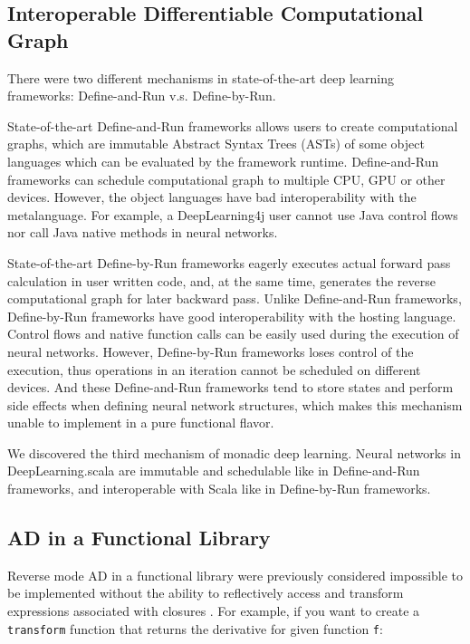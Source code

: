 \subsection{Interoperable Differentiable Computational Graph}

There were two different mechanisms in state-of-the-art deep learning frameworks:
Define-and-Run v.s. Define-by-Run.

State-of-the-art Define-and-Run frameworks \cite{collobert2008torch,bergstra2010theano,jia2014caffe,chen2015mxnet,abadi2016tensorflow,intel2016bigdl,skymind2017deeplearning4j} allows users to create computational graphs, which are immutable Abstract Syntax Trees (ASTs) of some object languages which can be evaluated by the framework runtime. Define-and-Run frameworks can schedule computational graph to multiple CPU, GPU or other devices. However, the object languages have bad interoperability with the metalanguage. For example, a DeepLearning4j user cannot use Java control flows nor call Java native methods in neural networks.

State-of-the-art Define-by-Run frameworks \cite{tokui2015chainer,neubig2017dynet,google2017eager,paszke2017pytorch} eagerly executes actual forward pass calculation in user written code, and, at the same time, generates the reverse computational graph for later backward pass. Unlike Define-and-Run frameworks, Define-by-Run frameworks have good interoperability with the hosting language. Control flows and native function calls can be easily used during the execution of neural networks. However, Define-by-Run frameworks loses control of the execution, thus operations in an iteration cannot be scheduled on different devices. And these Define-and-Run frameworks tend to store states and perform side effects when defining neural network structures, which makes this mechanism unable to implement in a pure functional flavor.

We discovered the third mechanism of monadic deep learning. Neural networks in DeepLearning.scala are immutable and schedulable like in Define-and-Run frameworks, and interoperable with Scala like in Define-by-Run frameworks.

\subsection{AD in a Functional Library}

Reverse mode AD in a functional library were previously considered impossible to be implemented without the ability to reflectively access and transform expressions associated with closures \cite{pearlmutter2008reverse}. For example, if you want to create a \lstinline{transform} function that returns the derivative for given function \lstinline{f}:

